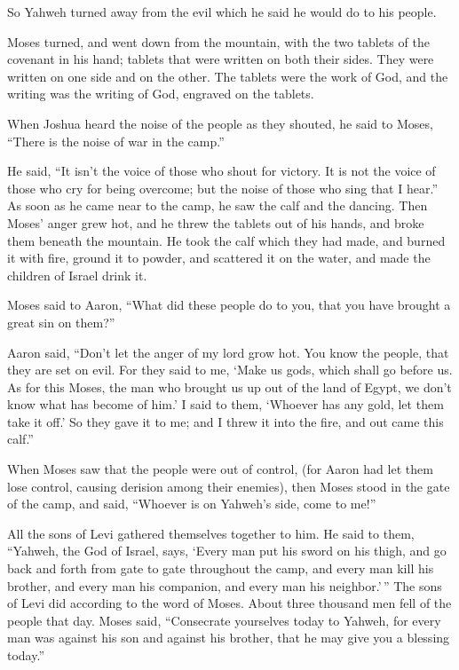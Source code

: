  So Yahweh turned away from the evil which he said he
would do to his people.

 Moses turned, and went down from the mountain, with the
two tablets of the covenant in his hand; tablets that were written on
both their sides. They were written on one side and on the other.
 The tablets were the work of God, and the writing was
the writing of God, engraved on the tablets.

 When Joshua heard the noise of the people as they
shouted, he said to Moses, ``There is the noise of war in the camp.''

 He said, ``It isn't the voice of those who shout for
victory. It is not the voice of those who cry for being overcome; but
the noise of those who sing that I hear.''  As soon as he
came near to the camp, he saw the calf and the dancing. Then Moses'
anger grew hot, and he threw the tablets out of his hands, and broke
them beneath the mountain.  He took the calf which they
had made, and burned it with fire, ground it to powder, and scattered it
on the water, and made the children of Israel drink it.

 Moses said to Aaron, ``What did these people do to you,
that you have brought a great sin on them?''

 Aaron said, ``Don't let the anger of my lord grow hot.
You know the people, that they are set on evil.  For they
said to me, `Make us gods, which shall go before us. As for this Moses,
the man who brought us up out of the land of Egypt, we don't know what
has become of him.'  I said to them, `Whoever has any
gold, let them take it off.' So they gave it to me; and I threw it into
the fire, and out came this calf.''

 When Moses saw that the people were out of control, (for
Aaron had let them lose control, causing derision among their enemies),
 then Moses stood in the gate of the camp, and said,
``Whoever is on Yahweh's side, come to me!''

All the sons of Levi gathered themselves together to him.
 He said to them, ``Yahweh, the God of Israel, says,
`Every man put his sword on his thigh, and go back and forth from gate
to gate throughout the camp, and every man kill his brother, and every
man his companion, and every man his neighbor.'\,''  The
sons of Levi did according to the word of Moses. About three thousand
men fell of the people that day.  Moses said,
``Consecrate yourselves today to Yahweh, for every man was against his
son and against his brother, that he may give you a blessing today.''

